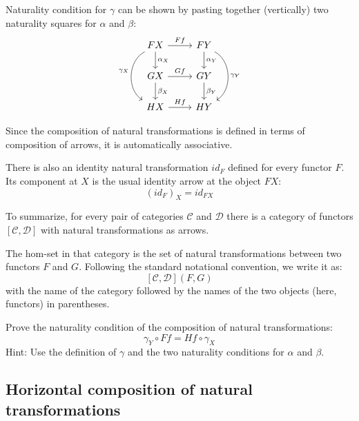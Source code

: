 \documentclass[DaoFP]{subfiles}
\begin{document}
Naturality condition for $\gamma$ can be shown by pasting together (vertically) two naturality squares for $\alpha$ and $\beta$:
\[
 \begin{tikzcd}
 F X
 \arrow[d, "\alpha_X"]
 \arrow[r, "F f"]
 \arrow[dd, bend right = 60, "\gamma_X"']
 &
F Y
  \arrow[d, "\alpha_Y"]
 \arrow[dd, bend left = 60, "\gamma_Y"]
 \\
G X
 \arrow[r, "G f"]
 \arrow[d, "\beta_X"]
& G Y
\arrow[d, "\beta_Y"]
\\
H X
\arrow[r, "H f"]
& H Y
 \end{tikzcd}
\]

Since the composition of natural transformations is defined in terms of composition of arrows, it is automatically associative. 

There is also an identity natural transformation $id_F$ defined for every functor $F$. Its component at $X$ is the usual identity arrow at the object $F X$:
\[ (id_F)_X = id_{F X} \]

To summarize, for every pair of categories $\mathcal{C}$ and $\mathcal{D}$ there is a category of functors $[\mathcal{C}, \mathcal{D}]$ with natural transformations as arrows. 

The hom-set in that category is the set of natural transformations between two functors $F$ and $G$. Following the standard notational convention, we write it as:
\[ [\mathcal{C}, \mathcal{D}](F, G) \]
with the name of the category followed by the names of the two objects (here, functors) in parentheses.


\begin{exercise}
Prove the naturality condition of the composition of natural transformations:
\[ \gamma_Y \circ F f = H f \circ \gamma_X \]
Hint: Use the definition of $\gamma$ and the two naturality conditions for $\alpha$ and $\beta$.
\end{exercise}

\subsection{Horizontal composition of natural transformations}
\end{document}
